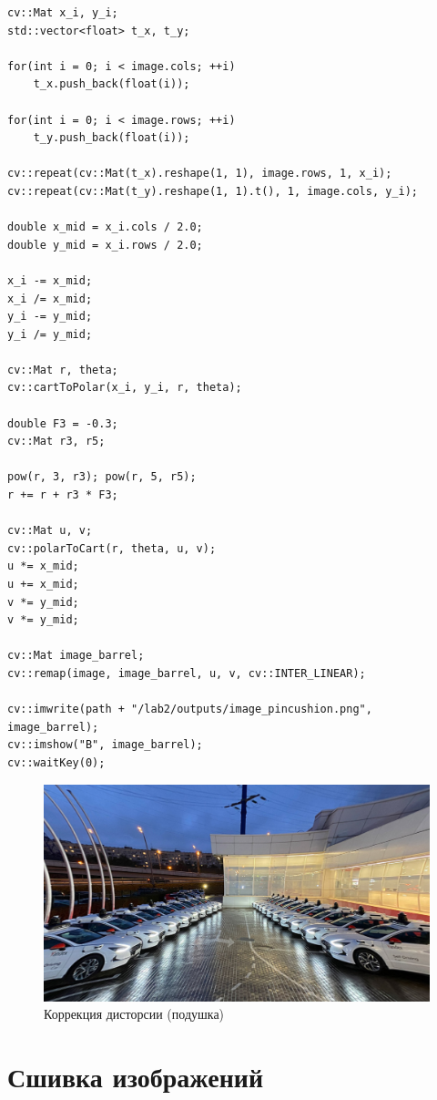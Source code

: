 \begin{lstlisting}[style=cpp_white, caption={Исходный код для коррекции подушкообразной дисторсии}]
cv::Mat x_i, y_i;
std::vector<float> t_x, t_y;

for(int i = 0; i < image.cols; ++i)
    t_x.push_back(float(i));

for(int i = 0; i < image.rows; ++i)
    t_y.push_back(float(i));

cv::repeat(cv::Mat(t_x).reshape(1, 1), image.rows, 1, x_i);
cv::repeat(cv::Mat(t_y).reshape(1, 1).t(), 1, image.cols, y_i);

double x_mid = x_i.cols / 2.0;
double y_mid = x_i.rows / 2.0;

x_i -= x_mid;
x_i /= x_mid;
y_i -= y_mid;
y_i /= y_mid;

cv::Mat r, theta;
cv::cartToPolar(x_i, y_i, r, theta);

double F3 = -0.3;
cv::Mat r3, r5;

pow(r, 3, r3); pow(r, 5, r5);
r += r + r3 * F3;

cv::Mat u, v;
cv::polarToCart(r, theta, u, v);
u *= x_mid;
u += x_mid;
v *= y_mid;
v *= y_mid;

cv::Mat image_barrel;
cv::remap(image, image_barrel, u, v, cv::INTER_LINEAR);

cv::imwrite(path + "/lab2/outputs/image_pincushion.png", image_barrel);
cv::imshow("B", image_barrel);
cv::waitKey(0);
\end{lstlisting}

\begin{figure}[ht]
    \includegraphics[width=\textwidth]{../outputs/image_pincushion.png}
    \caption{Коррекция дисторсии (подушка)}
    \label{fig:distortion_correction_pincushion}
\end{figure}

\pagebreak
\section{Сшивка изображений}

